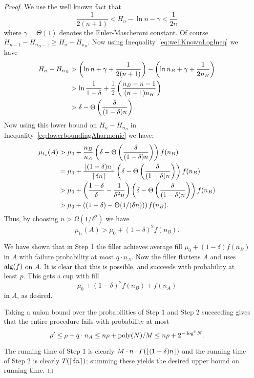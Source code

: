 \begin{proof}
  We use the well known fact that 
  \begin{equation}
    \label{eq:wellKnownLogIneq}
    \frac{1}{2(n+1)} < H_n - \ln n - \gamma < \frac{1}{2n}
  \end{equation}
  where $\gamma = \Theta(1)$ denotes the Euler-Mascheroni constant.
  Of course $H_{n-1}-H_{n_B-1} \ge H_n - H_{n_B}.$ Now using
  Inequality~\eqref{eq:wellKnownLogIneq} we have
  \begin{align*}
    H_n - H_{n_B} &> \left( \ln n + \gamma + \frac{1}{2(n+1)} \right) - \left( \ln n_B + \gamma + \frac{1}{2n_B} \right)\\
                  &> \ln \frac{1}{1-\delta} + \frac{1}{2}\left( \frac{n_B-n-1}{(n+1)n_B} \right)\\
                  &> \delta - \Theta\left( \frac{\delta}{(1-\delta)n} \right).
  \end{align*}
  Now using this lower bound on $H_n - H_{n_B}$ in
  Inequality~\eqref{eq:lowerboundingAharmonic} we have:
  \begin{align*}
    \mu_{t_*}(A) &> \mu_0 + \frac{n_B}{n_A}\left( \delta - \Theta\left( \frac{\delta}{(1-\delta)n} \right) \right)f(n_B)\\
                 &= \mu_0 + \frac{\left\lfloor (1-\delta)n \right\rfloor}{\left\lceil \delta n \right\rceil}\left( \delta - \Theta\left( \frac{\delta}{(1-\delta)n} \right) \right)f(n_B)\\
                 &> \mu_0 + \left( \frac{1-\delta}{\delta} - \frac{1}{\delta^2 n} \right)\left( \delta - \Theta\left( \frac{\delta}{(1-\delta)n} \right) \right)f(n_B)\\
                 &> \mu_0 + \left( (1-\delta) - \Theta(1/(\delta n)) \right)f(n_B).
  \end{align*}
  Thus, by choosing $n > \Omega(1/\delta^2)$ we have 
  $$\mu_{t_*}(A) > \mu_0 + (1-\delta)^2 f(n_B).$$

We have shown that in Step 1 the filler achieves average fill
$\mu_0 + (1-\delta)f(n_B)$ in $A$ with failure probability at
most $q\cdot n_A$.
Now the filler flattens $A$ and uses $\operatorname{\text{\textup{alg}}}(f)$ on $A$.
It is clear that this is possible, and succeeds with probability
at least $p$.
This gets a cup with fill 
$$\mu_0 + (1-\delta)^2 f(n_B) + f(n_A)$$
in $A$, as desired.

Taking a union bound over the probabilities of Step 1 and Step 2
succeeding gives that the entire procedure fails with probability
at most 
$$\rho' \le \rho + q \cdot n_A \le n \rho + \operatorname{\textnormal{poly}}(N)/M \le n\rho + 2^{-\log^4 N}.$$

The running time of Step 1 is clearly $M\cdot n\cdot
T(\left\lfloor (1-\delta)n \right\rfloor)$ and the running time of Step 2 is clearly
$T(\left\lceil \delta n \right\rceil)$; summing these yields the desired upper
bound on running time.

\end{proof}

